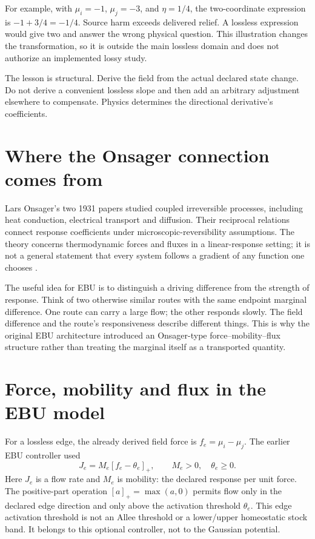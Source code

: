 For example, with \(\mu_i=-1\), \(\mu_j=-3\), and \(\eta=1/4\), the two-coordinate expression is \(-1+3/4=-1/4\). Source harm exceeds delivered relief. A lossless expression would give two and answer the wrong physical question. This illustration changes the transformation, so it is outside the main lossless domain and does not authorize an implemented lossy study.

The lesson is structural. Derive the field from the actual declared state change. Do not derive a convenient lossless slope and then add an arbitrary adjustment elsewhere to compensate. Physics determines the directional derivative's coefficients.

\section{Where the Onsager connection comes from}
Lars Onsager's two 1931 papers studied coupled irreversible processes, including
heat conduction, electrical transport and diffusion. Their reciprocal relations
connect response coefficients under microscopic-reversibility assumptions.
The theory concerns thermodynamic forces and fluxes in a linear-response
setting; it is not a general statement that every system follows a gradient
of any function one chooses \cite{onsager-one,onsager-two}.

The useful idea for EBU is to distinguish a driving difference from the
strength of response. Think of two otherwise similar routes with the same
endpoint marginal difference. One route can carry a large flow; the other
responds slowly. The field difference and the route's responsiveness describe
different things. This is why the original EBU architecture introduced an
Onsager-type force--mobility--flux structure rather than treating the marginal
itself as a transported quantity.

\section{Force, mobility and flux in the EBU model}
For a lossless edge, the already derived field force is
\(f_e=\mu_i-\mu_j\). The earlier EBU controller used
\begin{equation}\label{eq:intro-onsager}
 J_e=M_e[f_e-\theta_e]_+,\qquad M_e>0,\quad\theta_e\geq0.
\end{equation}
Here \(J_e\) is a flow rate and \(M_e\) is mobility: the declared response
per unit force. The positive-part operation \([a]_+=\max(a,0)\) permits
flow only in the declared edge direction and only above the activation
threshold \(\theta_e\). This edge activation threshold is not an Allee
threshold or a lower/upper homeostatic stock band. It belongs to this optional
controller, not to the Gaussian potential.

